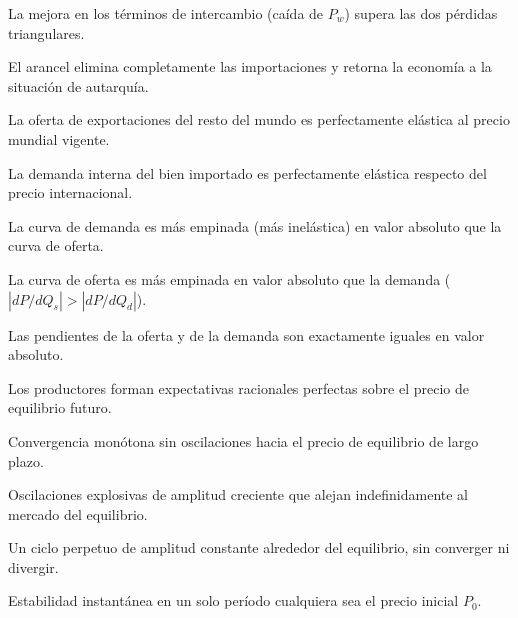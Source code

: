 \begin{opts}
    \item La mejora en los términos de intercambio (caída de $P_w$) supera las dos pérdidas triangulares.
    \item El arancel elimina completamente las importaciones y retorna la economía a la situación de autarquía.
    \item La oferta de exportaciones del resto del mundo es perfectamente elástica al precio mundial vigente.
    \item La demanda interna del bien importado es perfectamente elástica respecto del precio internacional.
\end{opts}

\begin{opts}
    \item La curva de demanda es más empinada (más inelástica) en valor absoluto que la curva de oferta.
    \item La curva de oferta es más empinada en valor absoluto que la demanda ($|dP/dQ_s| > |dP/dQ_d|$).
    \item Las pendientes de la oferta y de la demanda son exactamente iguales en valor absoluto.
    \item Los productores forman expectativas racionales perfectas sobre el precio de equilibrio futuro.
\end{opts}

\begin{opts}
    \item Convergencia monótona sin oscilaciones hacia el precio de equilibrio de largo plazo.
    \item Oscilaciones explosivas de amplitud creciente que alejan indefinidamente al mercado del equilibrio.
    \item Un ciclo perpetuo de amplitud constante alrededor del equilibrio, sin converger ni divergir.
    \item Estabilidad instantánea en un solo período cualquiera sea el precio inicial $P_0$.
\end{opts}

